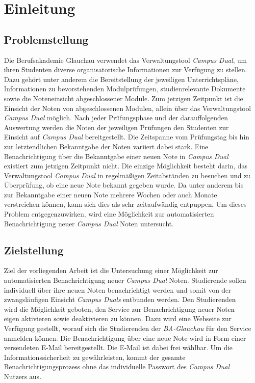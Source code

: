 \chapter{Einleitung}

\section{Problemstellung}
Die Berufsakademie Glauchau verwendet das Verwaltungstool \textit{Campus Dual}, um ihren Studenten diverse organisatorische Informationen zur Verfügung zu stellen.
Dazu gehört unter anderem die Bereitstellung der jeweiligen Unterrichtspläne, Informationen zu bevorstehenden Modulprüfungen, studienrelevante Dokumente sowie die Noteneinsicht abgeschlossener Module.
Zum jetzigen Zeitpunkt ist die Einsicht der Noten von abgeschlossenen Modulen, allein über das Verwaltungstool \textit{Campus Dual} möglich.
Nach jeder Prüfungsphase und der darauffolgenden Auswertung werden die Noten der jeweiligen Prüfungen den Studenten zur Einsicht auf \textit{Campus Dual} bereitgestellt.
Die Zeitspanne vom Prüfungstag bis hin zur letztendlichen Bekanntgabe der Noten variiert dabei stark.
Eine Benachrichtigung über die Bekanntgabe einer neuen Note in \textit{Campus Dual} existiert zum jetzigen Zeitpunkt nicht.
Die einzige Möglichkeit besteht darin, das Verwaltungstool \textit{Campus Dual} in regelmäßigen Zeitabständen zu besuchen und zu Überprüfung, ob eine neue Note bekannt gegeben wurde.
Da unter anderem bis zur Bekanntgabe einer neuen Note mehrere Wochen oder auch Monate verstreichen können, kann sich dies als sehr zeitaufwändig entpuppen.
Um dieses Problem entgegenzuwirken, wird eine Möglichkeit zur automatisierten Benachrichtigung neuer \textit{Campus Dual} Noten untersucht.


\section{Zielstellung}
Ziel der vorliegenden Arbeit ist die Untersuchung einer Möglichkeit zur automatisierten Benachrichtigung neuer \textit{Campus Dual} Noten.
Studierende sollen individuell über ihre neuen Noten benachrichtigt werden und somit von der zwangsläufigen Einsicht \textit{Campus Duals} entbunden werden.
Den Studierenden wird die Möglichkeit geboten, den Service zur Benachrichtigung neuer Noten eigen aktivieren sowie deaktivieren zu können.
Dazu wird eine Webseite zur Verfügung gestellt, worauf sich die Studierenden der \textit{BA-Glauchau} für den Service anmelden können.
Die Benachrichtigung über eine neue Note wird in Form einer versendeten E-Mail bereitgestellt.
Die E-Mail ist dabei frei wählbar.
Um die Informationssicherheit zu gewährleisten, kommt der gesamte Benachrichtigungsprozess ohne das individuelle Passwort des \textit{Campus Dual} Nutzers aus.






 
